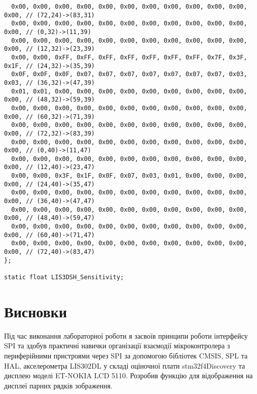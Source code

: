 \documentclass[oneside,14pt]{extarticle}
\begin{document}
\begin{normalsize}
{\begin{lstlisting}
  0x00, 0x00, 0x00, 0x00, 0x00, 0x00, 0x00, 0x00, 0x00, 0x00, 0x00, 0x00, // (72,24)->(83,31)
  0x00, 0x00, 0x00, 0x00, 0x00, 0x00, 0x00, 0x00, 0x00, 0x00, 0x00, 0x00, // (0,32)->(11,39)
  0x00, 0x00, 0x00, 0x00, 0x00, 0x00, 0x00, 0x00, 0x00, 0x00, 0x00, 0x00, // (12,32)->(23,39)
  0x00, 0x00, 0xFF, 0xFF, 0xFF, 0xFF, 0xFF, 0xFF, 0xFF, 0x7F, 0x3F, 0x1F, // (24,32)->(35,39)
  0x0F, 0x0F, 0x0F, 0x07, 0x07, 0x07, 0x07, 0x07, 0x07, 0x07, 0x03, 0x03, // (36,32)->(47,39)
  0x01, 0x01, 0x00, 0x00, 0x00, 0x00, 0x00, 0x00, 0x00, 0x00, 0x00, 0x00, // (48,32)->(59,39)
  0x00, 0x00, 0x00, 0x00, 0x00, 0x00, 0x00, 0x00, 0x00, 0x00, 0x00, 0x00, // (60,32)->(71,39)
  0x00, 0x00, 0x00, 0x00, 0x00, 0x00, 0x00, 0x00, 0x00, 0x00, 0x00, 0x00, // (72,32)->(83,39)
  0x00, 0x00, 0x00, 0x00, 0x00, 0x00, 0x00, 0x00, 0x00, 0x00, 0x00, 0x00, // (0,40)->(11,47)
  0x00, 0x00, 0x00, 0x00, 0x00, 0x00, 0x00, 0x00, 0x00, 0x00, 0x00, 0x00, // (12,40)->(23,47)
  0x00, 0x00, 0x3F, 0x1F, 0x0F, 0x07, 0x03, 0x01, 0x00, 0x00, 0x00, 0x00, // (24,40)->(35,47)
  0x00, 0x00, 0x00, 0x00, 0x00, 0x00, 0x00, 0x00, 0x00, 0x00, 0x00, 0x00, // (36,40)->(47,47)
  0x00, 0x00, 0x00, 0x00, 0x00, 0x00, 0x00, 0x00, 0x00, 0x00, 0x00, 0x00, // (48,40)->(59,47)
  0x00, 0x00, 0x00, 0x00, 0x00, 0x00, 0x00, 0x00, 0x00, 0x00, 0x00, 0x00, // (60,40)->(71,47)
  0x00, 0x00, 0x00, 0x00, 0x00, 0x00, 0x00, 0x00, 0x00, 0x00, 0x00, 0x00, // (72,40)->(83,47)
};

static float LIS3DSH_Sensitivity;
		\end{lstlisting}
	}
	
	\section*{Висновки}
	Під час виконання лабораторної роботи я засвоїв принципи роботи інтерфейсу SPI та здобув практичні навички організації взаємодії мікроконтролера з периферійними пристроями через SPI за допомогою бібліотек CMSIS, SPL та HAL, акселерометра LIS302DL у складі оціночної плати stm32f4Discovery та дисплею моделі ET-NOKIA LCD 5110. Розробив функцію для відображення на дисплеї парних рядків зображення.
	    
\end{normalsize}
\end{document}
